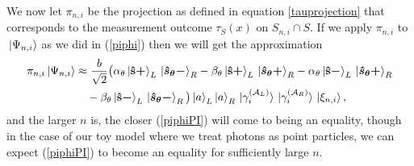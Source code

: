 We now let $\pi_{n,i}$ be the projection as defined in equation \ref{tauprojection} that corresponds to the measurement outcome $\tau_S(x)$ on $S_{n,i}\cap S$. If we apply $\pi_{n,i}$ to $\ket*{\Psi_{n,i}}$ as we did in (\ref{piphi}) then we will get the approximation
\begin{equation}\label{piphiPI}
	\begin{split}
		\pi_{n,i}\ket{\Psi_{n,i}}&\approx\frac{b}{\sqrt{2}}\big(\alpha_\theta\ket*{{\vb{\hat{{s}}}\bm{+}}}_L\ket*{\bm{\hat{s}_\theta-}}_R
		-\beta_\theta\ket*{{\vb{\hat{{s}}}\bm{+}}}_L\ket*{\bm{\hat{s}_\theta+}}_R-\alpha_\theta\ket*{{\vb{\hat{{s}}}\bm{-}}}_L\ket*{\bm{\hat{s}_\theta+}}_R\\
		&\quad
		-\beta_\theta\ket*{{\vb{\hat{{s}}}\bm{-}}}_L\ket*{\bm{\hat{s}_\theta-}}_R\big)\ket{a}_L\ket{a}_R\ket*{\gamma_i^{(\mathcal{A}_L)}}\ket*{\gamma_i^{(\mathcal{A}_R)}}\ket*{\xi_{n,i}},
		\end{split}
\end{equation}
and the larger $n$ is, the closer (\ref{piphiPI}) will come to being an equality, though in the case of our toy model where we treat photons as point particles, we can expect (\ref{piphiPI}) to become an equality for sufficiently large $n$.



